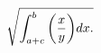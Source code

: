 \documentclass[preview]{standalone}
\begin{document}
\begin{align*}
\sqrt{ \int_ {a + c}^ {b} {\left( {x \over y} \right)} d x .}
\end{align*}
\end{document}
